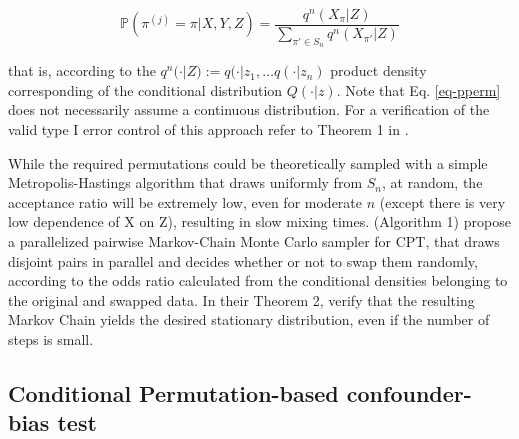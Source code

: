 \documentclass{article}
\begin{document}
\begin{equation}
    \mathbb{P}(\pi^{(j)} = \pi | X,Y,Z) = \frac{q^n(X_\pi | Z)}{\sum_{\pi' \in S_n} q^n(X_{\pi'} | Z)}
    \label{eq-pperm}
\end{equation}

that is, according to the $q^n(\cdot|Z) := q(\cdot | z_1, \dots q(\cdot|z_n)$ product density corresponding of the conditional distribution $Q(\cdot|z)$. Note that Eq. \ref{eq-pperm} does not necessarily assume a continuous distribution.
For a verification of the valid type I error control of this approach refer to Theorem 1 in \citep{berrett2020conditional}.

While the required permutations could be theoretically sampled with a simple Metropolis-Hastings algorithm that draws uniformly from $S_n$, at random, the acceptance ratio will be extremely low, even for moderate $n$ (except there is very low dependence of X on Z), resulting in slow mixing times. \cite{berrett2020conditional} (Algorithm 1) propose a parallelized pairwise Markov-Chain Monte Carlo sampler for CPT, that draws disjoint pairs in parallel and decides whether or not to swap them randomly, according to the odds ratio calculated from the conditional densities belonging to the original and swapped data. In their Theorem 2, \cite{berrett2020conditional} verify that the resulting Markov Chain yields the desired stationary distribution, even if the number of steps is small.

\subsection{Conditional Permutation-based confounder-bias test}
\end{document}

